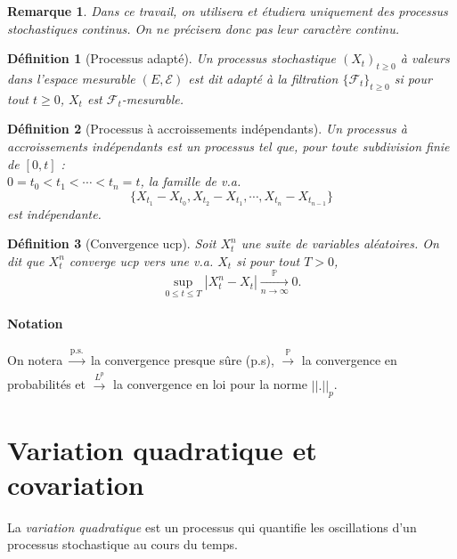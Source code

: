 \documentclass[openany]{book}
\newcommand{\F}{\mathscr{F}}
\newcommand{\carE}{\mathscr{E}}
\renewcommand{\P}{\mathds{P}}
\newcommand{\1}{\mathbbm{1}}
\theoremstyle{thmfont}
\theoremstyle{deffont}
\newtheorem{definition}[definition]{Définition}
\theoremstyle{thmfont}
\theoremstyle{deffont}
\newtheorem{remark}[remark]{Remarque}
\begin{document}
\begin{remark} Dans ce travail, on utilisera et étudiera uniquement des processus stochastiques continus. On ne précisera donc pas leur caractère continu.
\end{remark}

\begin{definition}[Processus adapté] Un processus stochastique $(X_t)_{t\ge0}$ à valeurs dans l'espace mesurable $(E, \carE)$ est dit \textit{adapté} à la filtration $\{\F_t\}_{t\geq0}$ si pour tout $t\geq0$, $X_t$ est $\F_t$-mesurable.
\label{def:pr_adapte}
\end{definition}
  

\begin{definition}[Processus à accroissements indépendants]
  \label{def:pr_accr_indep} Un processus à \textit{accroissements indépendants} est un processus tel que, pour toute subdivision finie de $[0,t]$ :\\  $0 = t_0 < t_1 < \cdots < t_n = t$, la famille de v.a.
    $$\{X_{t_1} - X_{t_0}, X_{t_2} - X_{t_1}, \cdots ,X_{t_n} - X_{t_{n-1}}\}$$
    est indépendante.
  \end{definition}

  \begin{definition}[Convergence ucp] Soit $X_t^n$ une suite de variables aléatoires. On dit que $X_t^n$ \textit{converge ucp} vers une v.a. $X_t$ si pour tout $T >0$, 
    $$\underset{0 \leq t \leq T}{\sup}|X_t^n - X_t| \xrightarrow[n \to \infty]{\P} 0.$$
  \end{definition}

  \paragraph{Notation}
  On notera $\xrightarrow[]{\text{p.s.}}$ la convergence presque sûre (p.s), $\xrightarrow[]{\P}$ la convergence en probabilités et $\xrightarrow[]{L^p}$ la convergence en loi pour la norme $||.||_p$.
    
\section{Variation quadratique et covariation}

La \textit{variation quadratique} est un processus qui quantifie les oscillations d'un processus stochastique au cours du temps. %
\end{document}
